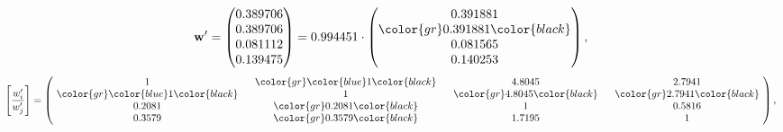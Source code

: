 \begin{example}
\begin{equation*}
\mathbf{w}^{\prime} =
\begin{pmatrix}
0.389706\\
0.389706\\
0.081112\\
0.139475
\end{pmatrix} =
0.994451\cdot
\begin{pmatrix}
0.391881\\
\color{gr} 0.391881\color{black} \\
0.081565\\
0.140253
\end{pmatrix},
\end{equation*}
\begin{equation*}
\left[ \frac{{w}^{\prime}_i}{{w}^{\prime}_j} \right] =
\begin{pmatrix}
$\,\,$ 1 $\,\,$ & $\,\,$\color{gr} \color{blue} 1\color{black} $\,\,$ & $\,\,$4.8045$\,\,$ & $\,\,$2.7941$\,\,$ \\
$\,\,$\color{gr} \color{blue} 1\color{black} $\,\,$ & $\,\,$ 1 $\,\,$ & $\,\,$\color{gr} 4.8045\color{black} $\,\,$ & $\,\,$\color{gr} 2.7941\color{black}   $\,\,$ \\
$\,\,$0.2081$\,\,$ & $\,\,$\color{gr} 0.2081\color{black} $\,\,$ & $\,\,$ 1 $\,\,$ & $\,\,$0.5816 $\,\,$ \\
$\,\,$0.3579$\,\,$ & $\,\,$\color{gr} 0.3579\color{black} $\,\,$ & $\,\,$1.7195$\,\,$ & $\,\,$ 1  $\,\,$ \\
\end{pmatrix},
\end{equation*}
\end{example}
\newpage
